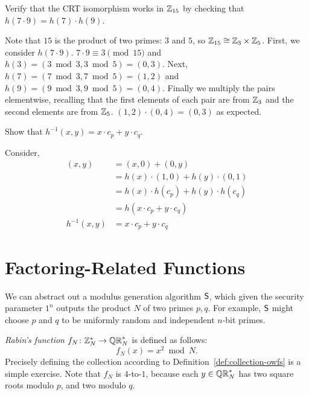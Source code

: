 \documentclass[11pt]{article}
\begin{document}
\begin{question}
    Verify that the CRT isomorphism works in $\mathbb{Z}_{15}$ by checking that $h(7 \cdot 9) = h(7) \cdot h(9)$.
\end{question}
\begin{answer}
    Note that $15$ is the product of two primes: $3$ and $5$, so \(\mathbb{Z}_{15} \cong \mathbb{Z}_3
    \times \mathbb{Z}_5\).  First, we consider \(h(7 \cdot 9)\). \(7 \cdot 9 \equiv 3 \pmod{15}\)
    and \(h(3) = (3 \bmod 3, 3 \bmod 5) = (0, 3)\). Next, \(h(7) = (7 \bmod{3}, 7
    \bmod{5}) = (1,2)\) and \(h(9) = (9 \bmod{3}, 9 \bmod 5) = (0, 4)\). Finally we
    multiply the pairs elementwise, recalling that the first elements of each pair are
    from \(\mathbb{Z}_3\) and the second elements are from \(\mathbb{Z}_5\).  \((1,2) \cdot (0,4) =
    (0,3)\) as expected.
\end{answer}
\begin{question}
    Show that \(h^{-1}(x,y) = x \cdot c_p + y \cdot c_q\).
\end{question}
\begin{answer}
    Consider,
    \begin{align*}
        (x,y) &= (x, 0) + (0, y) \\
              &= h(x) \cdot (1,0) + h(y) \cdot (0,1) \\
              &= h(x) \cdot h(c_p) + h(y) \cdot h(c_q) \\
              &= h(x \cdot c_p + y \cdot c_q) \\
        h^{-1}(x,y) &= x \cdot c_p + y \cdot c_q
    \end{align*}
\end{answer}



\section{Factoring-Related Functions}
\label{sec:fact-related}

We can abstract out a modulus generation algorithm $\mathsf{S}$, which
given the security parameter $1^{n}$ outputs the product $N$ of two
primes $p,q$.  For example, $\mathsf{S}$ might choose $p$ and $q$ to be
uniformly random and independent $n$-bit primes.

\emph{Rabin's function} $f_{N} \colon \mathbb{Z}_N^{*} \to \mathbb{QR}_{N}^{*}$ is defined
as follows: \[ f_{N}(x) = x^{2} \bmod N. \] Precisely defining the
collection according to Definition~\ref{def:collection-owfs} is a
simple exercise.  Note that $f_{N}$ is $4$-to-$1$, because each $y \in
\mathbb{QR}_{N}^{*}$ has two square roots modulo $p$, and two modulo $q$.
\end{document}
